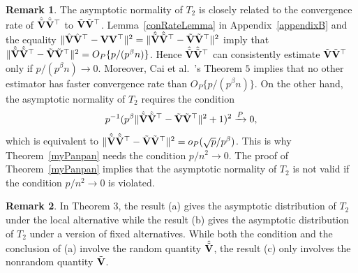 \documentclass[times,sort&compress,3p]{elsarticle}
\theoremstyle{plain}
\theoremstyle{definition}
\newtheorem{remark}{\quad\quad Remark}
\theoremstyle{remark}
\begin{document}
\begin{remark}
The asymptotic normality of $T_2$ is closely related to the convergence rate of $\hat{\tilde{\mathbf{V}}}\hat{\tilde{\mathbf{V}}}^\top $ to $\tilde{\mathbf{V}}\tilde{\mathbf{V}}^\top $.
    Lemma~\ref{conRateLemma} in Appendix~\ref{appendixB} and the equality $\|\hat{\mathbf{V}}\hat{\mathbf{V}}^\top  -\mathbf{V} \mathbf{V}^\top \|^2=\|\hat{\tilde{\mathbf{V}}}\hat{\tilde{\mathbf{V}}}^\top  -\tilde{\mathbf{V}} \tilde{\mathbf{V}}^\top \|^2$ imply that 
    $\|\hat{\tilde{\mathbf{V}}}\hat{\tilde{\mathbf{V}}}^\top  -\tilde{\mathbf{V}} \tilde{\mathbf{V}}^\top \|^2=O_P\{p/(p^{\beta}n)\}$.
    Hence $\hat{\tilde{\mathbf{V}}}\hat{\tilde{\mathbf{V}}}^\top $ can consistently estimate $\tilde{\mathbf{V}}\tilde{\mathbf{V}}^\top $ only if $p/(p^{\beta}n)\to 0$.
    Moreover, Cai {\rm et al.}~\cite{Cai2012Sparse}'s Theorem $5$ implies that no other estimator has faster convergence rate than $O_P\{p/(p^{\beta}n)\}$.
    On the other hand, the asymptotic normality of $T_2$ requires the condition
    $$
    p^{-1}(p^{\beta}\|\hat{\tilde{\mathbf{V}}}\hat{\tilde{\mathbf{V}}}^\top  -\tilde{\mathbf{V}} \tilde{\mathbf{V}}^\top \|^2+1 )^2\xrightarrow{P} 0,
    $$
    which is equivalent to $\|\hat{\tilde{\mathbf{V}}}\hat{\tilde{\mathbf{V}}}^\top  -\tilde{\mathbf{V}} \tilde{\mathbf{V}}^\top \|^2=o_P(\sqrt{p}/p^{\beta})$.
    This is why Theorem~\ref{myPanpan} needs the condition  $p/n^2\to 0$.
The proof of Theorem~\ref{myPanpan} implies that the asymptotic normality of $T_2$ is not valid if the condition $p/n^2\to 0$ is violated.
\end{remark}
\begin{remark}
    In Theorem 3, the result (a) gives the asymptotic distribution of $T_2$ under the local alternative while the result (b) gives the asymptotic distribution of $T_2$ under a version of fixed alternatives.
    While both the condition and the conclusion of (a) involve the random quantity $\hat{\tilde{\mathbf{V}}}$, the result (c) only involves the nonrandom quantity $\tilde{\mathbf{V}}$.
\end{remark}
\end{document}
